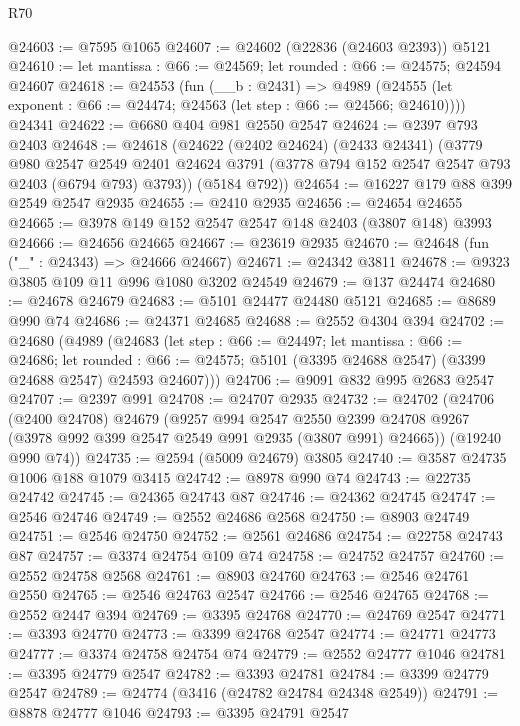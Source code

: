 \begin{lexlean}{R70}
\begin{coremodule}
@24603 := @7595 @1065
@24607 := @24602 (@22836 (@24603 @2393)) @5121
@24610 := let mantissa : @66 := @24569; let rounded : @66 := @24575; @24594 @24607
@24618 := @24553
    (fun (__b : @2431) =>
    @4989 (@24555 (let exponent : @66 := @24474; @24563 (let step : @66 := @24566; @24610))))
    @24341
@24622 := @6680 @404 @981 @2550 @2547
@24624 := @2397 @793 @2403
@24648 := @24618
    (@24622
      (@2402 @24624)
      (@2433 @24341)
      (@3779
        @980
        @2547
        @2549
        @2401
        @24624
        @3791
        (@3778 @794 @152 @2547 @2547 @793 @2403 (@6794 @793) @3793))
      (@5184 @792))
@24654 := @16227 @179 @88 @399 @2549 @2547 @2935
@24655 := @2410 @2935
@24656 := @24654 @24655
@24665 := @3978 @149 @152 @2547 @2547 @148 @2403 (@3807 @148) @3993
@24666 := @24656 @24665
@24667 := @23619 @2935
@24670 := @24648 (fun ("_" : @24343) => @24666 @24667)
@24671 := @24342 @3811
@24678 := @9323 @3805 @109 @11 @996 @1080 @3202 @24549
@24679 := @137 @24474
@24680 := @24678 @24679
@24683 := @5101 @24477 @24480 @5121
@24685 := @8689 @990 @74
@24686 := @24371 @24685
@24688 := @2552 @4304 @394
@24702 := @24680
    (@4989
      (@24683
        (let step : @66 := @24497;
        let mantissa : @66 := @24686;
        let rounded : @66 := @24575;
        @5101 (@3395 @24688 @2547) (@3399 @24688 @2547) @24593 @24607)))
@24706 := @9091 @832 @995 @2683 @2547
@24707 := @2397 @991
@24708 := @24707 @2935
@24732 := @24702
    (@24706
      (@2400 @24708)
      @24679
      (@9257
        @994
        @2547
        @2550
        @2399
        @24708
        @9267
        (@3978 @992 @399 @2547 @2549 @991 @2935 (@3807 @991) @24665))
      (@19240 @990 @74))
@24735 := @2594 (@5009 @24679) @3805
@24740 := @3587 @24735 @1006 @188 @1079 @3415
@24742 := @8978 @990 @74
@24743 := @22735 @24742
@24745 := @24365 @24743 @87
@24746 := @24362 @24745
@24747 := @2546 @24746
@24749 := @2552 @24686 @2568
@24750 := @8903 @24749
@24751 := @2546 @24750
@24752 := @2561 @24686
@24754 := @22758 @24743 @87
@24757 := @3374 @24754 @109 @74
@24758 := @24752 @24757
@24760 := @2552 @24758 @2568
@24761 := @8903 @24760
@24763 := @2546 @24761 @2550
@24765 := @2546 @24763 @2547
@24766 := @2546 @24765
@24768 := @2552 @2447 @394
@24769 := @3395 @24768
@24770 := @24769 @2547
@24771 := @3393 @24770
@24773 := @3399 @24768 @2547
@24774 := @24771 @24773
@24777 := @3374 @24758 @24754 @74
@24779 := @2552 @24777 @1046
@24781 := @3395 @24779 @2547
@24782 := @3393 @24781
@24784 := @3399 @24779 @2547
@24789 := @24774 (@3416 (@24782 @24784 @24348 @2549))
@24791 := @8878 @24777 @1046
@24793 := @3395 @24791 @2547

\end{coremodule}
\end{lexlean}
